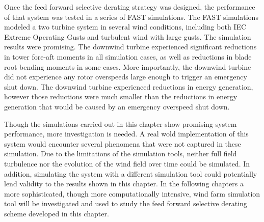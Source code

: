 Once the feed forward selective derating strategy was designed, the performance of that system was tested in a series of FAST simulations. The FAST simulations modeled a two turbine system in several wind conditions, including both  IEC Extreme Operating Gusts and turbulent wind with large gusts. The simulation results were promising. The downwind turbine experienced significant reductions in tower fore-aft moments in all simulation cases, as well as reductions in blade root bending moments in some cases. More importantly, the downwind turbine did not experience any rotor overspeeds large enough to trigger an emergency shut down. The downwind turbine experienced reductions in energy generation, however those reductions were much smaller than the reductions in energy generation that would be caused by an emergency overspeed shut down.

Though the simulations carried out in this chapter show promising system performance, more investigation is needed. A real wold implementation of this system would encounter several phenomena that were not captured in these simulation. Due to the limitations of the simulation tools, neither full field turbulence nor the evolution of the wind field over time could be simulated. In addition, simulating the system with a different simulation tool could potentially lend validity to the results shown in this chapter. In the following chapters a more sophisticated, though more computationally intensive, wind farm simulation tool will be investigated and used to study the feed forward selective derating scheme developed in this chapter.
